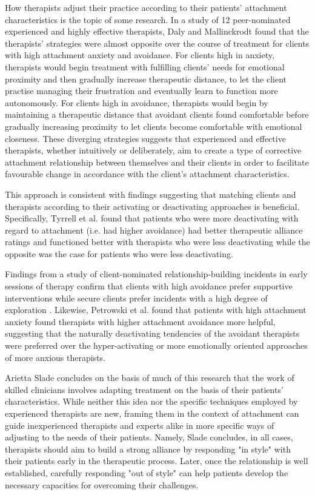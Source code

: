 \documentclass[12pt]{report}
\begin{document}
How therapists adjust their practice according to their patients' attachment characteristics is the topic of some research.
In a study of 12 peer-nominated experienced and highly effective therapists, Daly and Mallinckrodt \citeyear{Daly2009} found that the therapists' strategies were almost opposite over the course of treatment for clients with high attachment anxiety and avoidance.
For clients high in anxiety, therapists would begin treatment with fulfilling clients' needs for emotional proximity and then gradually increase therapeutic distance, to let the client practise managing their frustration and eventually learn to function more autonomously.
For clients high in avoidance, therapists would begin by maintaining a therapeutic distance that avoidant clients found comfortable before gradually increasing proximity to let clients become comfortable with emotional closeness.
These diverging strategies suggests that experienced and effective therapists, whether intuitively or deliberately, aim to create a type of corrective attachment relationship between themselves and their clients in order to facilitate favourable change in accordance with the client's attachment characteristics.

This approach is consistent with findings suggesting that matching clients and therapists according to their activating or deactivating approaches is beneficial.
Specifically, Tyrrell et al. \citeyear{Tyrrell1999} found that patients who were more deactivating with regard to attachment (i.e. had higher avoidance) had better therapeutic alliance ratings and functioned better with therapists who were less deactivating while the opposite was the case for patients who were less deactivating.

Findings from a study of client-nominated relationship-building incidents in early sessions of therapy confirm that clients with high avoidance prefer supportive interventions while secure clients prefer incidents with a high degree of exploration .
Likewise, Petrowski et al. \citeyear{Petrowski2011} found that patients with high attachment anxiety found therapists with higher attachment avoidance more helpful, suggesting that the naturally deactivating tendencies of the avoidant therapists were preferred over the hyper-activating or more emotionally oriented approaches of more anxious therapists.

Arietta Slade \citeyear{Slade2016} concludes on the basis of much of this research that the work of skilled clinicians involves adapting treatment on the basis of their patients' characteristics.
While neither this idea nor the specific techniques employed by experienced therapists are new, framing them in the context of attachment can guide inexperienced therapists and experts alike in more specific ways of adjusting to the needs of their patients.
Namely, Slade concludes, in all cases, therapists should aim to build a strong alliance by responding "in style" with their patients early in the therapeutic process.
Later, once the relationship is well established, carefully responding "out of style" can help patients develop the necessary capacities for overcoming their challenges.
\end{document}
